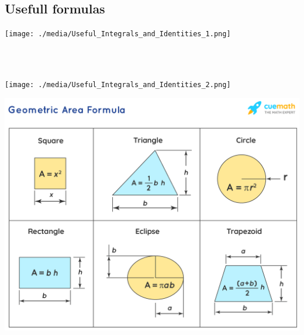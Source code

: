 \documentclass[8pt]{article}
\begin{document}
\begin{multicols*}{3}
  \section{Usefull formulas}
    \begin{minipage}{\linewidth-2cm}
      \texttt{[image: ./media/Useful\_Integrals\_and\_Identities\_1.png]}
    \end{minipage}
    \columnbreak
    \newpage
    $\;$ \\
    $\;$ \\
    \begin{minipage}{\linewidth-2cm}
      \texttt{[image: ./media/Useful\_Integrals\_and\_Identities\_2.png]}
    \end{minipage}
    \begin{minipage}{\linewidth-2cm}
      \includegraphics[width=\linewidth]{./media/areas.png}

\end{minipage}
\end{multicols*}
\end{document}
